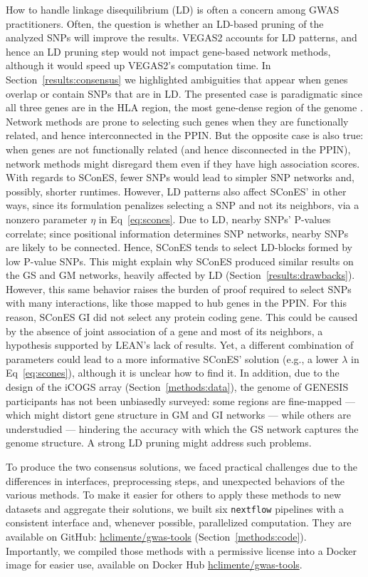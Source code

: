 \documentclass[10pt,letterpaper]{article}
\begin{document}
How to handle linkage disequilibrium (LD) is often a concern among GWAS practitioners. Often, the question is whether an LD-based pruning of the analyzed SNPs will improve the results. VEGAS2 accounts for LD patterns, and hence an LD pruning step would not impact gene-based network methods, although it would speed up VEGAS2's computation time. In Section~\ref{results:consensus} we highlighted ambiguities that appear when genes overlap or contain SNPs that are in LD. The presented case is paradigmatic since all three genes are in the HLA region, the most gene-dense region of the genome \cite{Xie2003}. Network methods are prone to selecting such genes when they are functionally related, and hence interconnected in the PPIN. But the opposite case is also true: when genes are not functionally related (and hence disconnected in the PPIN), network methods might disregard them even if they have high association scores. With regards to SConES, fewer SNPs would lead to simpler SNP networks and, possibly, shorter runtimes. However, LD patterns also affect SConES' in other ways, since its formulation penalizes selecting a SNP and not its neighbors, via a nonzero parameter $\eta$ in Eq~\ref{eq:scones}. Due to LD, nearby SNPs' P-values correlate; since positional information determines SNP networks, nearby SNPs are likely to be connected. Hence, SConES tends to select LD-blocks formed by low P-value SNPs. This might explain why SConES produced similar results on the GS and GM networks, heavily affected by LD (Section~\ref{results:drawbacks}). However, this same behavior raises the burden of proof required to select SNPs with many interactions, like those mapped to hub genes in the PPIN. For this reason, SConES GI did not select any protein coding gene. This could be caused by the absence of joint association of a gene and most of its neighbors, a hypothesis supported by LEAN's lack of results. Yet, a different combination of parameters could lead to a more informative SConES' solution (e.g., a lower \(\lambda\) in Eq~\ref{eq:scones}), although it is unclear how to find it. In addition, due to the design of the iCOGS array (Section~\ref{methods:data}), the genome of GENESIS participants has not been unbiasedly surveyed: some regions are fine-mapped --- which might distort gene structure in GM and GI networks --- while others are understudied --- hindering the accuracy with which the GS network captures the genome structure. A strong LD pruning might address such problems. 

To produce the two consensus solutions, we faced practical challenges due to the differences in interfaces, preprocessing steps, and unexpected behaviors of the various methods. To make it easier for others to apply these methods to new datasets and aggregate their solutions, we built six \texttt{nextflow} pipelines \cite{di_tommaso_nextflow_2017} with a consistent interface and, whenever possible, parallelized computation. They are available on GitHub: \href{https://github.com/hclimente/gwas-tools}{hclimente/gwas-tools} (Section~\ref{methods:code}). Importantly, we compiled those methods with a permissive license into a Docker image for easier use, available on Docker Hub \href{https://hub.docker.com/r/hclimente/gwas-tools}{hclimente/gwas-tools}.
\end{document}
